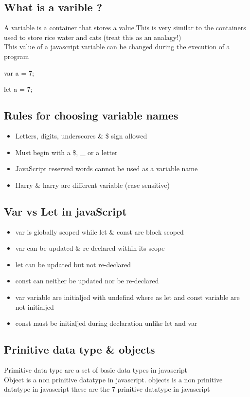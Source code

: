 \documentclass[11pt]{article}
\begin{document}
\subsection*{What is a varible ?}
\label{sec:orge988bd8}
A variable is a container that stores a value.This is very similar to the containers used to store rice water and cats (treat this as an analagy!) \\
This value of a javascript variable can be changed during the execution of a program

var a = 7;

let a = 7;
\subsection*{Rules for choosing variable names}
\label{sec:org03ea81d}
\begin{itemize}
\item Letters, digits, underscores \& \$ sign allowed
\item Must begin with a \$, \_ or a letter
\item JavaScript reserved words cannot be used as a variable name
\item Harry \& harry are different variable (case sensitive)
\end{itemize}
\subsection*{Var vs Let in javaScript}
\label{sec:org06c4922}
\begin{itemize}
\item var is globally scoped while let \& const are block scoped
\item var can be updated \& re-declared within its scope
\item let can be updated but not re-declared
\item const can neither be updated nor be re-declared
\item var variable are initialjed with undefind where as let and const variable are not initialjed
\item const must be initialjed during declaration unlike let and var
\end{itemize}
\subsection*{Prinitive data type \& objects}
\label{sec:org27ecfec}
Primitive data type are a set of basic data types in javascript \\
Object is a non prinitive datatype in javascript.
objects is a non prinitive datatype in javascript
these are the 7 prinitive datatype in javascript
\end{document}
